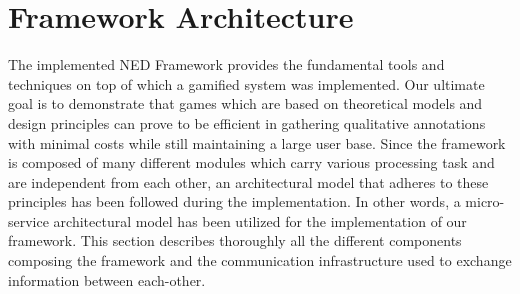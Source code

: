 \section{Framework Architecture}
\label{framework:architecture}
The implemented NED Framework provides the fundamental tools and techniques on top of which a gamified system was implemented. Our ultimate goal is to demonstrate that games which are based on theoretical models and design principles can prove to be efficient in gathering qualitative annotations with minimal costs while still maintaining a large user base. Since the framework is composed of many different modules which carry various processing task and are independent from each other, an architectural model that adheres to these principles has been followed during the implementation. In other words, a micro-service architectural model has been utilized for the implementation of our framework. This section describes thoroughly all the different components composing the framework and the communication infrastructure used to exchange information between each-other. 



\newpage 








\newpage
